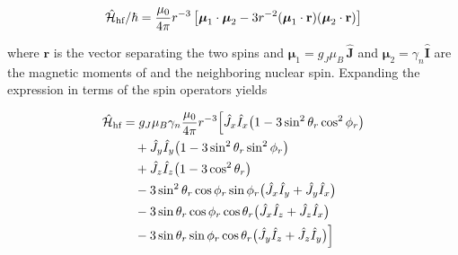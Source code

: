 \begin{equation}
    \hat{\mathcal{H}}_{\text{hf}} / \hbar = \frac{\mu_0}{4\pi} r^{-3} 
    \left[ \boldsymbol{\mu}_1 \cdot \boldsymbol{\mu}_2 
    - 3r^{-2} (\boldsymbol{\mu}_1 \cdot \mathbf{r})(\boldsymbol{\mu}_2 \cdot \mathbf{r}) \right]
    \label{eq:base_hyperfine}
\end{equation}

\noindent where $\mathbf{r}$ is the vector separating the two spins and $\boldsymbol{\mu}_1 = g_J \mu_B \, \hat{\mathbf{J}}$ and $\boldsymbol{\mu}_2 = \gamma_n \hat{\mathbf{I}}$ are the magnetic moments of \Er and the neighboring nuclear spin. Expanding the expression in terms of the spin operators yields

\begin{equation}
\begin{aligned}
\hat{\mathcal{H}}_{\text{hf}} &= 
g_J \mu_B \gamma_n \frac{\mu_0}{4\pi} r^{-3} \Big[ 
 \hat{J}_{x} \hat{I}_{x} \big( 1 - 3 \sin^2 \theta_r \cos^2 \phi_r \big) \\
&\quad + \hat{J}_{y} \hat{I}_{y} \big( 1 - 3 \sin^2 \theta_r \sin^2 \phi_r \big) \\
&\quad + \hat{J}_{z} \hat{I}_{z} \big( 1 - 3 \cos^2 \theta_r \big) \\
&\quad - 3 \sin^2 \theta_r \cos \phi_r \sin \phi_r 
\big( \hat{J}_{x} \hat{I}_{y} + \hat{J}_{y} \hat{I}_{x} \big) \\
&\quad - 3 \sin \theta_r \cos \phi_r \cos \theta_r 
\big( \hat{J}_{x} \hat{I}_{z} + \hat{J}_{z} \hat{I}_{x} \big) \\
&\quad - 3 \sin \theta_r \sin \phi_r \cos \theta_r 
\big( \hat{J}_{y} \hat{I}_{z} + \hat{J}_{z} \hat{I}_{y} \big) 
\Big]
\end{aligned}
\end{equation}

